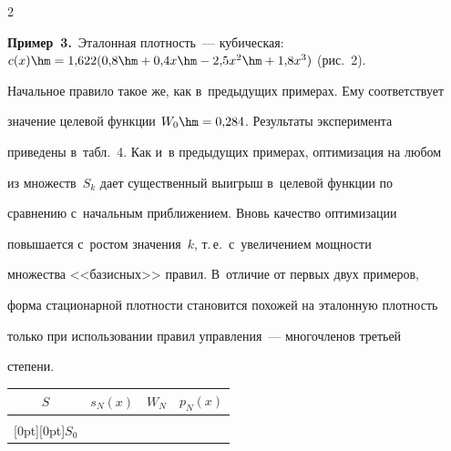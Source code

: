 \begin{multicols}{2}
   


   




   


   \noindent


   \textbf{Пример~3.}\ Эталонная плот\-ность~--- кубическая: $c(x)\hm= 


1{,}622(0{,}8\hm+0{,}4x\hm- 2{,}5x^2\hm+ 1{,}8x^3)$ (рис.~2). 


Начальное правило такое же, как в~предыду\-щих примерах. Ему соответствует 


значение целевой функции $W_0\hm=0{,}284$. Результаты эксперимента 


приведены в~табл.~4. Как и~в предыду\-щих примерах, оптимизация на любом 


из множеств~$S_k$ дает существенный выигрыш в~целевой функции по 


сравнению с~начальным при\-бли\-же\-ни\-ем. Вновь качество оптимизации 


повышается с~ростом значения~$k$, т.\,е.\ с~увеличением мощ\-ности 


множества <<базисных>> правил. В~отличие от первых двух примеров, 


форма стационарной плот\-ности становится похожей на эталонную плотность 


только при использовании правил управ\-ле\-ния~--- многочленов третьей 


сте\-пени.





\begin{table}\small %


\begin{center}




\vspace*{2ex}





\begin{tabular}{|c|c|c|c|}


\hline


$S$ & $s_N(x)$ &  $W_N$& $p_N(x)$\\


\hline


&&&\\[-6pt]


\raisebox{24pt}[0pt][0pt]{$S_0$} & \mbox{%


}
\end{tabular}
\end{center}
\end{table}
\end{multicols}
